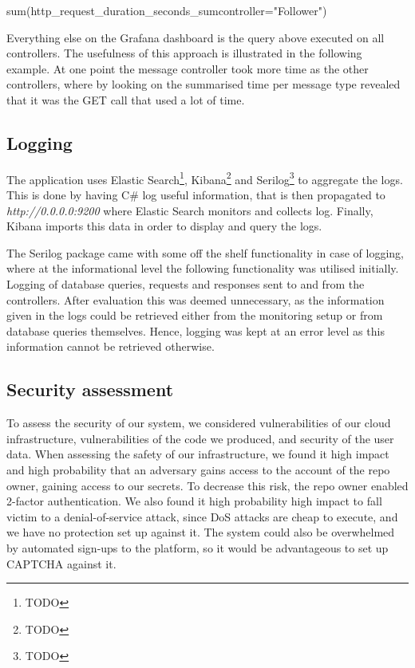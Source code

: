 \documentclass[report/main.tex]{subfiles}
\begin{document}
            \begin{center}
                sum(http\_request\_duration\_seconds\_sum{controller="Follower"})
            \end{center}
                
            Everything else on the Grafana dashboard is the query above executed on all controllers. The usefulness of this approach is illustrated in the following example. At one point the message controller took more time as the other controllers, where by looking on the summarised time per message type revealed that it was the GET call that used a lot of time.
                

        \subsection{Logging}
            \label{SubSec:logging}
            The application uses Elastic Search\footnote{TODO}, Kibana\footnote{TODO} and Serilog\footnote{TODO} to aggregate the logs. This is done by having C\# log useful information, that is then propagated to \textit{http://0.0.0.0:9200} where Elastic Search monitors and collects log. Finally, Kibana imports this data in order to display and query the logs.
            
            The Serilog package came with some off the shelf functionality in case of logging, where at the informational level the following functionality was utilised initially. Logging of database queries, requests and responses sent to and from the controllers. After evaluation this was deemed unnecessary, as the information given in the logs could be retrieved either from the monitoring setup or from database queries themselves. Hence, logging was kept at an error level as this information cannot be retrieved otherwise.

        \subsection{Security assessment}
            To assess the security of our system, we considered vulnerabilities of our cloud infrastructure, vulnerabilities of the code we produced, and security of the user data.
            When assessing the safety of our infrastructure, we found it high impact and high probability that an adversary gains access to the account of the repo owner, gaining access to our secrets. To decrease this risk, the repo owner enabled 2-factor authentication. We also found it high probability high impact to fall victim to a denial-of-service attack, since DoS attacks are cheap to execute, and we have no protection set up against it. The system could also be overwhelmed by automated sign-ups to the platform, so it would be advantageous to set up CAPTCHA against it.
        
\end{document}
